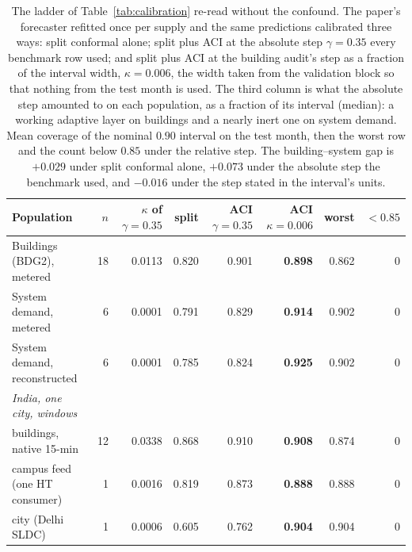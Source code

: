 \begin{table}[t]
\centering
\scriptsize
\setlength{\tabcolsep}{3pt}
\begin{tabular}{lrrrrrrr}
\toprule
Population & $n$ & $\kappa$ of $\gamma{=}0.35$ & split & ACI $\gamma{=}0.35$ & ACI $\kappa{=}0.006$ & worst & $<0.85$ \\
\midrule
Buildings (BDG2), metered & 18 & 0.0113 & 0.820 & 0.901 & \textbf{0.898} & 0.862 & 0 \\
System demand, metered & 6 & 0.0001 & 0.791 & 0.829 & \textbf{0.914} & 0.902 & 0 \\
System demand, reconstructed & 6 & 0.0001 & 0.785 & 0.824 & \textbf{0.925} & 0.902 & 0 \\
\midrule
\emph{India, one city, windows} &  &  &  &  &  &  &  \\
\quad buildings, native 15-min & 12 & 0.0338 & 0.868 & 0.910 & \textbf{0.908} & 0.874 & 0 \\
\quad campus feed (one HT consumer) & 1 & 0.0016 & 0.819 & 0.873 & \textbf{0.888} & 0.888 & 0 \\
\quad city (Delhi SLDC) & 1 & 0.0006 & 0.605 & 0.762 & \textbf{0.904} & 0.904 & 0 \\
\bottomrule
\end{tabular}
\caption{The ladder of Table~\ref{tab:calibration} re-read without the confound. The paper's forecaster refitted once per supply and the same predictions calibrated three ways: split conformal alone; split plus ACI at the absolute step $\gamma=0.35$ every benchmark row used; and split plus ACI at the building audit's step as a fraction of the interval width, $\kappa=0.006$, the width taken from the validation block so that nothing from the test month is used. The third column is what the absolute step amounted to on each population, as a fraction of its interval (median): a working adaptive layer on buildings and a nearly inert one on system demand. Mean coverage of the nominal $0.90$ interval on the test month, then the worst row and the count below $0.85$ under the relative step. The building--system gap is $+0.029$ under split conformal alone, $+0.073$ under the absolute step the benchmark used, and $-0.016$ under the step stated in the interval's units.}
\label{tab:aci-step}
\end{table}
